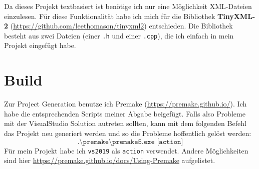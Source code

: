 \documentclass[a4paper,12pt]{article}
\begin{document}
Da dieses Projekt textbasiert ist benötige ich nur eine Möglichkeit XML-Dateien einzulesen. Für diese Funktionalität habe ich mich für die Bibliothek \textbf{TinyXML-2} (\url{https://github.com/leethomason/tinyxml2}) entschieden.
Die Bibliothek besteht aus zwei Dateien (einer \texttt{.h} und einer \texttt{.cpp}), die ich einfach in mein Projekt eingefügt habe.

\section*{Build}

Zur Project Generation benutze ich Premake (\url{https://premake.github.io/}). Ich habe die entsprechenden Scripts meiner Abgabe beigefügt.
Falls also Probleme mit der VisualStudio Solution autreten sollten,
kann mit dem folgenden Befehl das Projekt neu generiert werden und so die Probleme hoffentlich gelöst werden:
\[\texttt{.\textbackslash premake\textbackslash premake5.exe [action]}\]
Für mein Projekt habe ich \texttt{vs2019} als \texttt{action} verwendet. Andere Möglichkeiten sind hier \url{https://premake.github.io/docs/Using-Premake} aufgelistet.
\end{document}
